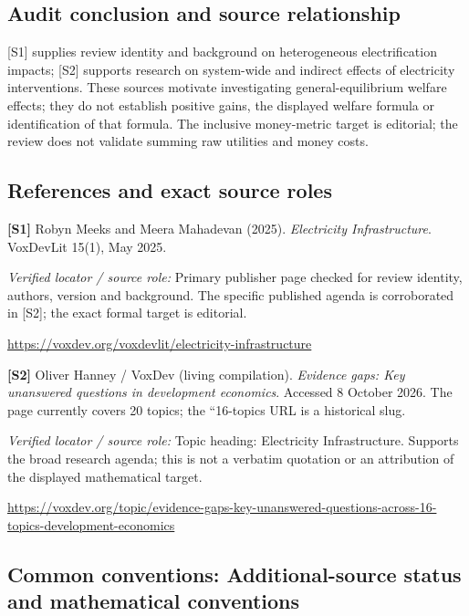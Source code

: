 \documentclass[11pt,a4paper]{article}
\begin{document}
\subsection*{Audit conclusion and source relationship}

[S1] supplies review identity and background on heterogeneous electrification impacts; [S2] supports research on system-wide and indirect effects of electricity interventions. These sources motivate investigating general-equilibrium welfare effects; they do not establish positive gains, the displayed welfare formula or identification of that formula. The inclusive money-metric target is editorial; the review does not validate summing raw utilities and money costs.

\subsection*{References and exact source roles}

{\footnotesize\raggedright
\par\noindent\textbf{[S1]} Robyn Meeks and Meera Mahadevan (2025). \emph{Electricity Infrastructure}. VoxDevLit 15(1), May 2025.\par \textit{Verified locator / source role:} Primary publisher page checked for review identity, authors, version and background. The specific published agenda is corroborated in [S2]; the exact formal target is editorial.\par \url{https://voxdev.org/voxdevlit/electricity-infrastructure}\par\smallskip
\par\noindent\textbf{[S2]} Oliver Hanney / VoxDev (living compilation). \emph{Evidence gaps: Key unanswered questions in development economics}. Accessed 8 October 2026. The page currently covers 20 topics; the ``16-topics URL is a historical slug.\par \textit{Verified locator / source role:} Topic heading: Electricity Infrastructure. Supports the broad research agenda; this is not a verbatim quotation or an attribution of the displayed mathematical target.\par \url{https://voxdev.org/topic/evidence-gaps-key-unanswered-questions-across-16-topics-development-economics}\par\smallskip
}

\subsection*{Common conventions: Additional-source status and mathematical conventions}
\end{document}
